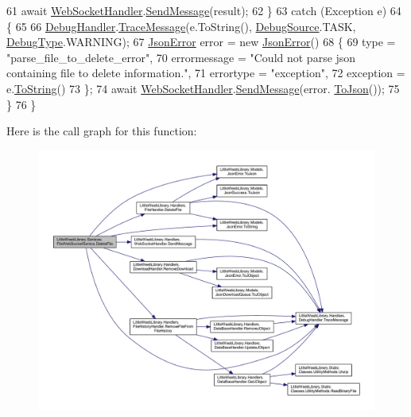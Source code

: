 \begin{DoxyCode}
61                 await \mbox{\hyperlink{class_little_weeb_library_1_1_handlers_1_1_web_socket_handler}{WebSocketHandler}}.\mbox{\hyperlink{class_little_weeb_library_1_1_handlers_1_1_web_socket_handler_a1de289d54d665a32c93478c68d3e6ad0}{SendMessage}}(result);
62             \}
63             \textcolor{keywordflow}{catch} (Exception e)
64             \{
65 
66                 \mbox{\hyperlink{class_little_weeb_library_1_1_handlers_1_1_debug_handler}{DebugHandler}}.\mbox{\hyperlink{class_little_weeb_library_1_1_handlers_1_1_debug_handler_afccb37dfd6b2114af72000c2f4fe4607}{TraceMessage}}(e.ToString(), 
      \mbox{\hyperlink{namespace_little_weeb_library_1_1_handlers_a2a6ca0775121c9c503d58aa254d292be}{DebugSource}}.TASK, \mbox{\hyperlink{namespace_little_weeb_library_1_1_handlers_ab66019ed40462876ec4e61bb3ccb0a62}{DebugType}}.WARNING);
67                 \mbox{\hyperlink{class_little_weeb_library_1_1_models_1_1_json_error}{JsonError}} error = \textcolor{keyword}{new} \mbox{\hyperlink{class_little_weeb_library_1_1_models_1_1_json_error}{JsonError}}()
68                 \{
69                     type = \textcolor{stringliteral}{"parse\_file\_to\_delete\_error"},
70                     errormessage = \textcolor{stringliteral}{"Could not parse json containing file to delete information."},
71                     errortype = \textcolor{stringliteral}{"exception"},
72                     exception = e.\mbox{\hyperlink{class_little_weeb_library_1_1_models_1_1_json_error_ad7d5522c90119111d2e929f39e7f6d3c}{ToString}}()
73                 \};
74                 await \mbox{\hyperlink{class_little_weeb_library_1_1_handlers_1_1_web_socket_handler}{WebSocketHandler}}.\mbox{\hyperlink{class_little_weeb_library_1_1_handlers_1_1_web_socket_handler_a1de289d54d665a32c93478c68d3e6ad0}{SendMessage}}(error.
      \mbox{\hyperlink{class_little_weeb_library_1_1_models_1_1_json_error_a0e3e7dd2e2990404b7f0461742b23440}{ToJson}}());
75             \}
76         \}
\end{DoxyCode}
Here is the call graph for this function\+:\nopagebreak
\begin{figure}[H]
\begin{center}
\leavevmode
\includegraphics[width=350pt]{class_little_weeb_library_1_1_services_1_1_file_web_socket_service_ab1375e8e82a50dfa06d91bebe988d133_cgraph}
\end{center}
\end{figure}

